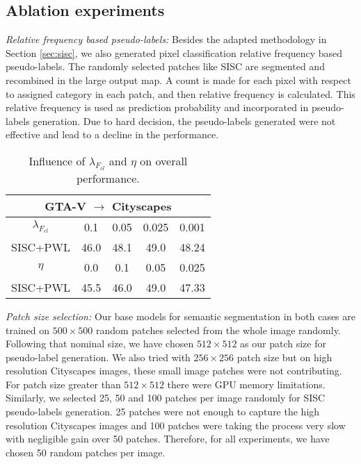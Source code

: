 \documentclass[10pt,twocolumn,letterpaper]{article}
\begin{document}
\subsection{Ablation experiments}
\label{sec:abl}
\vspace{-0.1cm}
\textit{Relative frequency based pseudo-labels:} Besides the adapted methodology in Section \ref{sec:sisc}, we also generated pixel classification relative frequency based pseudo-labels. The randomly selected patches like SISC are segmented and recombined in the large output map. A count is made for each pixel with respect to assigned category in each patch, and then relative frequency is calculated. This relative frequency is used as prediction probability and incorporated in pseudo-labels generation. Due to hard decision, the pseudo-labels generated were not effective and lead to a decline in the performance. 
\vspace{-0.2cm}
\begin{table}[H]
\scriptsize
\centering
\caption{Influence of $\lambda_{F_{cl}}$ and $\eta$ on overall performance.}
\begin{tabular}{ccccc}
\hline
\multicolumn{5}{c}{GTA-V $\rightarrow$ Cityscapes} \\
\hline
$\lambda_{F_{cl}}$        & 0.1        & 0.05       & 0.025       & 0.001                \\
SISC+PWL           & 46.0       & 48.1       & 49.0        & 48.24   \\
\hline
$\eta$& 0.0  & 0.1        & 0.05       & 0.025                \\
SISC+PWL           &45.5    & 46.0       & 49.0       & 47.33   \\
\hline
\end{tabular}
\label{table:5}
\vspace{-0.3cm}
\end{table}
\textit{Patch size selection:} Our base models for semantic segmentation in both cases are trained on $500 \times 500$ random patches selected from the whole image randomly. Following that nominal size, we have chosen $512 \times 512$ as our patch size for pseudo-label generation. We also tried with $256 \times 256$ patch size but on high resolution Cityscapes images, these small image patches were not contributing. For patch size greater than $512 \times 512$ there were GPU memory limitations. Similarly, we selected 25, 50 and 100 patches per image randomly for SISC pseudo-labels generation. 25 patches were not enough to capture the high resolution Cityscapes images and 100 patches were taking the process very slow with negligible gain over 50 patches. Therefore, for all experiments, we have chosen 50 random patches per image.
\end{document}
